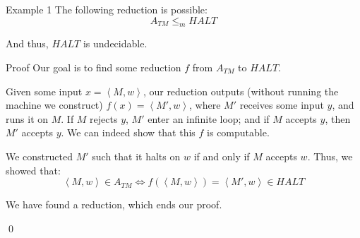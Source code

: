 \documentclass[a4paper]{article}
\begin{document}
\begin{parag}{Example 1}
    The following reduction is possible: 
    \[A_{TM} \leq_m HALT\]
    
    And thus, $HALT$ is undecidable.

    \begin{subparag}{Proof}
        Our goal is to find some reduction $f$ from $A_{TM}$ to $HALT$.

        Given some input $x = \left\langle M, w \right\rangle$, our reduction outputs (without running the machine we construct) $f\left(x\right) = \left\langle M', w \right\rangle$, where $M'$ receives some input $y$, and runs it on $M$. If $M$ rejects $y$, $M'$ enter an infinite loop; and if $M$ accepts $y$, then $M'$ accepts $y$. We can indeed show that this $f$ is computable.

        We constructed $M'$ such that it halts on $w$ if and only if $M$ accepts $w$. Thus, we showed that: 
        \[\left\langle M, w \right\rangle \in A_{TM} \iff f\left(\left\langle M, w \right\rangle\right) = \left\langle M', w \right\rangle \in HALT\]

        We have found a reduction, which ends our proof.

        \qed
    \end{subparag}
\end{parag}
\end{document}

